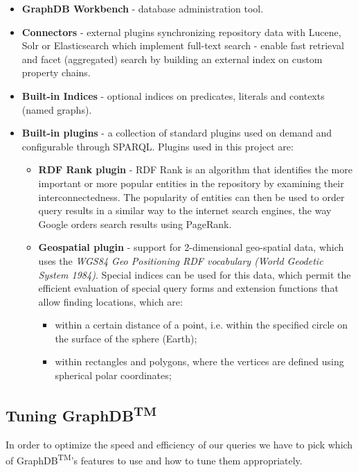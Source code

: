 \begin{itemize}
    \item \textbf{GraphDB Workbench} - database administration tool.
    \item \textbf{Connectors} - external plugins synchronizing repository data with Lucene, Solr or Elasticsearch which implement full-text search - enable fast retrieval and facet (aggregated) search by building an external index on custom property chains.
    \item \textbf{Built-in Indices} - optional indices on predicates, literals and contexts (named graphs).
    \item \textbf{Built-in plugins} - a collection of standard plugins used on demand and configurable through SPARQL. Plugins used in this project are:
        \begin{itemize}
            \item \textbf{RDF Rank plugin} - RDF Rank is an algorithm that identifies the more important or more popular entities in the repository by examining their interconnectedness. The popularity of entities can then be used to order query results in a similar way to the internet search engines, the way Google orders search results using PageRank.
            \item \textbf{Geospatial plugin} - support for 2-dimensional geo-spatial data, which uses the \textit{WGS84 Geo Positioning RDF vocabulary (World Geodetic System 1984)}. Special indices can be used for this data, which permit the efficient evaluation of special query forms and extension functions that allow finding locations, which are:
                \begin{itemize}
                    \item within a certain distance of a point, i.e. within the specified circle on the surface of the sphere (Earth);
                    \item within rectangles and polygons, where the vertices are defined using spherical polar coordinates;
                \end{itemize}
        \end{itemize}
\end{itemize}

\subsection{Tuning GraphDB\textsuperscript{TM}}
In order to optimize the speed and efficiency of our queries we have to pick which of GraphDB\textsuperscript{TM}'s features to use and how to tune them appropriately. 


